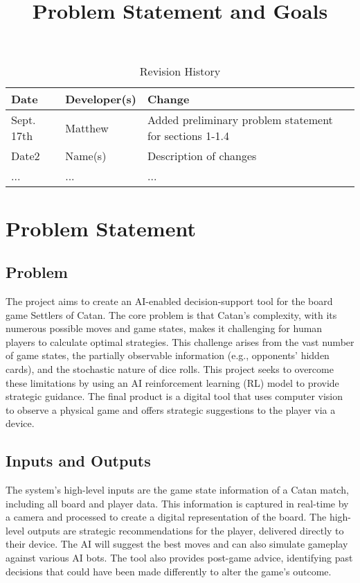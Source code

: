 \documentclass{article}
\title{Problem Statement and Goals\\\progname}
\author{\authname}
\date{}
\begin{document}
\maketitle

\begin{table}[hp]
\caption{Revision History} \label{TblRevisionHistory}
\begin{tabularx}{\textwidth}{llX}
\toprule
\textbf{Date} & \textbf{Developer(s)} & \textbf{Change}\\
\midrule
Sept. 17th & Matthew & Added preliminary problem statement for sections 1-1.4\\
Date2 & Name(s) & Description of changes\\
... & ... & ...\\
\bottomrule
\end{tabularx}
\end{table}

\section{Problem Statement}

\subsection{Problem}
The project aims to create an AI-enabled decision-support tool for the board game Settlers of Catan. The core problem is that Catan's complexity, with its numerous possible moves and game states, makes it challenging for human players to calculate optimal strategies. This challenge arises from the vast number of game states, the partially observable information (e.g., opponents' hidden cards), and the stochastic nature of dice rolls. This project seeks to overcome these limitations by using an AI reinforcement learning (RL) model to provide strategic guidance. The final product is a digital tool that uses computer vision to observe a physical game and offers strategic suggestions to the player via a device.

\subsection{Inputs and Outputs}
The system's high-level inputs are the game state information of a Catan match, including all board and player data. This information is captured in real-time by a camera and processed to create a digital representation of the board. The high-level outputs are strategic recommendations for the player, delivered directly to their device. The AI will suggest the best moves and can also simulate gameplay against various AI bots. The tool also provides post-game advice, identifying past decisions that could have been made differently to alter the game's outcome.
\end{document}
